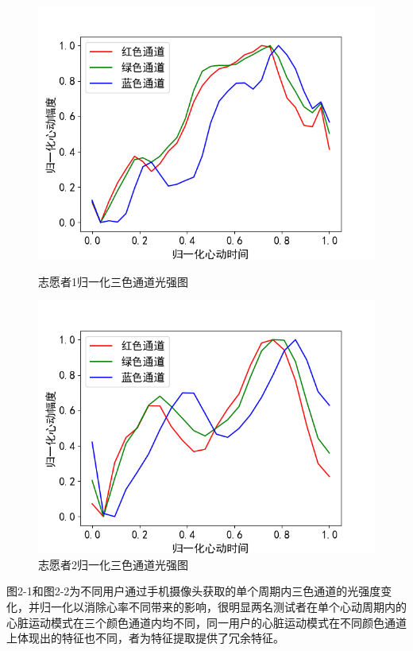 \begin{figure}[htp]
\centering
    \begin{minipage}[t]{0.49\textwidth}
        \centering
        \includegraphics[width=1\textwidth]{images/Figure_8.png}
        \caption{志愿者1归一化三色通道光强图}
        \label{2-2}
    \end{minipage}
    \begin{minipage}[t]{0.49\textwidth}
        \centering
        \includegraphics[width=1\textwidth]{images/Figure_9.png}
        \caption{志愿者2归一化三色通道光强图}
        \label{2-3}
        \end{minipage}
\end{figure}
\par
{图2-1和图2-2为不同用户通过手机摄像头获取的单个周期内三色通道的光强度变化，并归一化以消除心率不同带来的影响，很明显两名测试者在单个心动周期内的心脏运动模式在三个颜色通道内均不同，同一用户的心脏运动模式在不同颜色通道上体现出的特征也不同，者为特征提取提供了冗余特征。}

